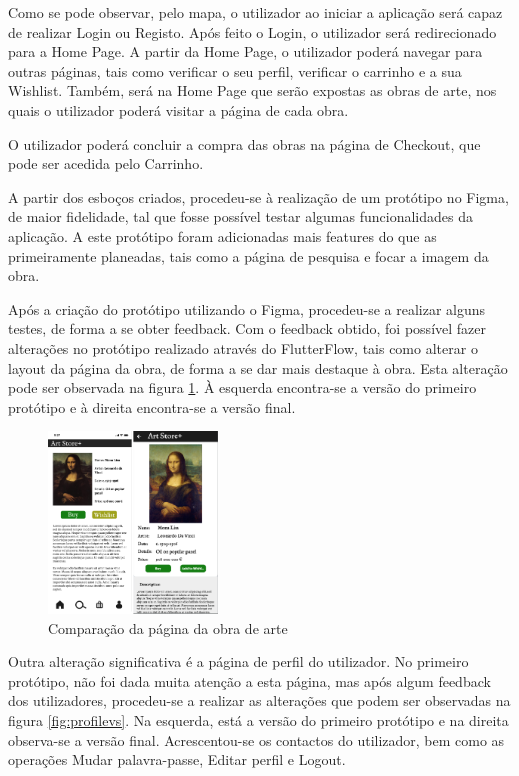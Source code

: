 \documentclass[conference]{IEEEtran}
\begin{document}
Como se pode observar, pelo mapa, o utilizador ao iniciar a aplicação será capaz de realizar Login ou Registo. 
Após feito o Login, o utilizador será redirecionado para a Home Page. A partir da Home Page, o utilizador poderá 
navegar para outras páginas, tais como verificar o seu perfil, verificar o carrinho e a sua Wishlist. Também, 
será na Home Page que serão expostas as obras de arte, nos quais o utilizador poderá visitar a página de cada obra. 

O utilizador poderá concluir a compra das obras na página de Checkout, que pode ser acedida pelo Carrinho.

A partir dos esboços criados, procedeu-se à realização de um protótipo no Figma, de maior fidelidade, tal que 
fosse possível testar algumas funcionalidades da aplicação. A este protótipo foram adicionadas mais features do 
que as primeiramente planeadas, tais como a página de pesquisa e focar a imagem da obra.

Após a criação do protótipo utilizando o Figma, procedeu-se a realizar alguns testes, de forma a se obter feedback. 
Com o feedback obtido, foi possível fazer alterações no protótipo realizado através do FlutterFlow, tais como 
alterar o layout da página da obra, de forma a se dar mais destaque à obra. Esta alteração pode ser observada na 
figura \ref{fig:earlyvslate}. À esquerda encontra-se a versão do primeiro protótipo e à direita 
encontra-se a versão final.

\begin{figure}[h]
    \centering
    \includegraphics[width=0.4\textwidth]{artpiece-early-vs-latest.png}
    \caption{Comparação da página da obra de arte}
    \label{fig:earlyvslate}
\end{figure}

Outra alteração significativa é a página de perfil do utilizador. No primeiro protótipo, 
não foi dada muita atenção a esta página, mas após algum feedback dos utilizadores, procedeu-se 
a realizar as alterações que podem ser observadas na figura \ref{fig:profilevs}. Na esquerda, 
está a versão do primeiro protótipo e na direita observa-se a versão final. Acrescentou-se 
os contactos do utilizador, bem como as operações Mudar palavra-passe, Editar perfil e Logout.
\end{document}

